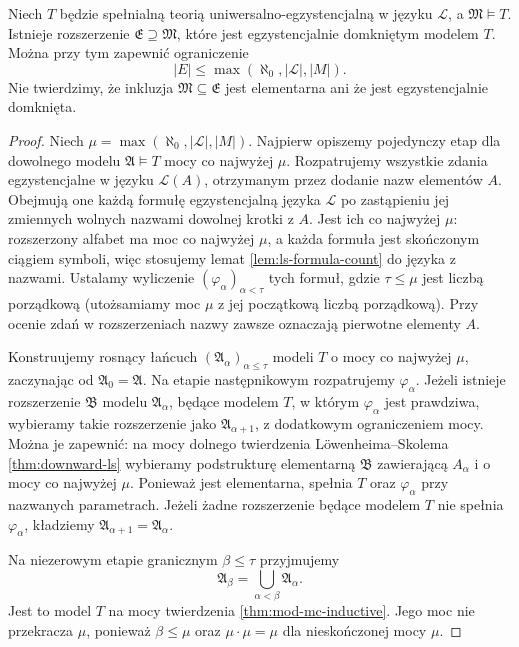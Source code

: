 \begin{twierdzenie}
\label{thm:mod-mc-ec-extension}
Niech $T$ będzie spełnialną teorią uniwersalno-egzystencjalną
w języku $\mathcal L$, a $\mathfrak M\models T$.
Istnieje rozszerzenie $\mathfrak E\supseteq\mathfrak M$,
które jest egzystencjalnie domkniętym modelem $T$.
Można przy tym zapewnić ograniczenie
\[
|E|\leq\max(\aleph_0,|\mathcal L|,|M|).
\]
Nie twierdzimy, że inkluzja
$\mathfrak M\subseteq\mathfrak E$ jest elementarna
ani że jest egzystencjalnie domknięta.
\end{twierdzenie}
\begin{proof}
Niech $\mu=\max(\aleph_0,|\mathcal L|,|M|)$.
Najpierw opiszemy pojedynczy etap dla dowolnego modelu
$\mathfrak A\models T$ mocy co najwyżej $\mu$.
Rozpatrujemy wszystkie zdania egzystencjalne w języku
$\mathcal L(A)$, otrzymanym przez dodanie nazw elementów
$A$. Obejmują one każdą formułę egzystencjalną języka
$\mathcal L$ po zastąpieniu jej zmiennych wolnych
nazwami dowolnej krotki z $A$. Jest ich co najwyżej $\mu$:
rozszerzony alfabet ma moc co najwyżej $\mu$, a każda
formuła jest skończonym ciągiem symboli, więc stosujemy
lemat \ref{lem:ls-formula-count} do języka z nazwami.
Ustalamy wyliczenie $(\varphi_\alpha)_{\alpha<\tau}$
tych formuł, gdzie $\tau\leq\mu$ jest liczbą porządkową
(utożsamiamy moc $\mu$ z jej początkową liczbą porządkową).
Przy ocenie zdań w rozszerzeniach nazwy zawsze
oznaczają pierwotne elementy $A$.

Konstruujemy rosnący łańcuch
$(\mathfrak A_\alpha)_{\alpha\leq\tau}$ modeli $T$
o mocy co najwyżej $\mu$, zaczynając od
$\mathfrak A_0=\mathfrak A$. Na etapie następnikowym
rozpatrujemy $\varphi_\alpha$.
Jeżeli istnieje rozszerzenie $\mathfrak B$ modelu
$\mathfrak A_\alpha$, będące modelem $T$, w którym
$\varphi_\alpha$ jest prawdziwa, wybieramy takie
rozszerzenie jako $\mathfrak A_{\alpha+1}$,
z dodatkowym ograniczeniem mocy.
Można je zapewnić: na mocy dolnego twierdzenia
Löwenheima--Skolema \ref{thm:downward-ls} wybieramy
podstrukturę elementarną $\mathfrak B$ zawierającą
$A_\alpha$ i o mocy co najwyżej $\mu$.
Ponieważ jest elementarna, spełnia $T$ oraz
$\varphi_\alpha$ przy nazwanych parametrach.
Jeżeli żadne rozszerzenie będące modelem $T$
nie spełnia $\varphi_\alpha$, kładziemy
$\mathfrak A_{\alpha+1}=\mathfrak A_\alpha$.

Na niezerowym etapie granicznym $\beta\leq\tau$
przyjmujemy
\[
\mathfrak A_\beta=\bigcup_{\alpha<\beta}\mathfrak A_\alpha.
\]
Jest to model $T$ na mocy twierdzenia
\ref{thm:mod-mc-inductive}. Jego moc nie przekracza
$\mu$, ponieważ $\beta\leq\mu$ oraz
$\mu\cdot\mu=\mu$ dla nieskończonej mocy $\mu$.


\end{proof}
